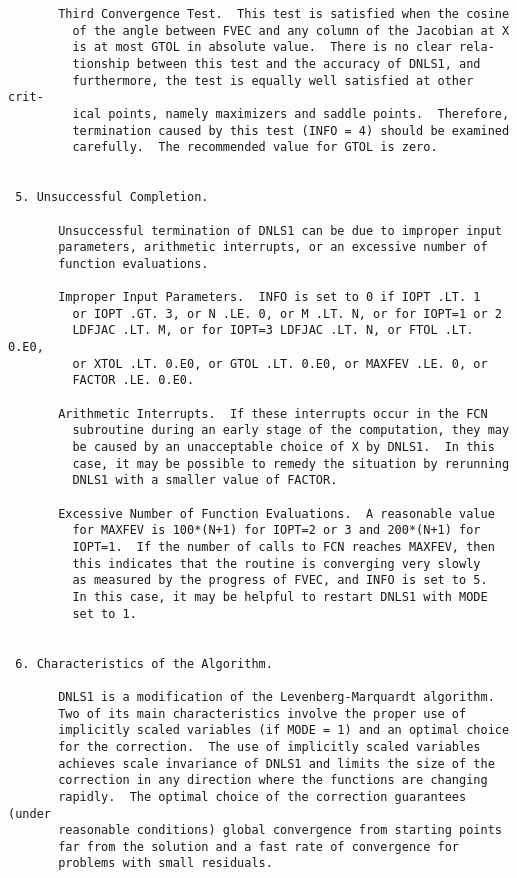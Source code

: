 \begin{verbatim}
       Third Convergence Test.  This test is satisfied when the cosine
         of the angle between FVEC and any column of the Jacobian at X
         is at most GTOL in absolute value.  There is no clear rela-
         tionship between this test and the accuracy of DNLS1, and
         furthermore, the test is equally well satisfied at other crit-
         ical points, namely maximizers and saddle points.  Therefore,
         termination caused by this test (INFO = 4) should be examined
         carefully.  The recommended value for GTOL is zero.


 5. Unsuccessful Completion.

       Unsuccessful termination of DNLS1 can be due to improper input
       parameters, arithmetic interrupts, or an excessive number of
       function evaluations.

       Improper Input Parameters.  INFO is set to 0 if IOPT .LT. 1
         or IOPT .GT. 3, or N .LE. 0, or M .LT. N, or for IOPT=1 or 2
         LDFJAC .LT. M, or for IOPT=3 LDFJAC .LT. N, or FTOL .LT. 0.E0,
         or XTOL .LT. 0.E0, or GTOL .LT. 0.E0, or MAXFEV .LE. 0, or
         FACTOR .LE. 0.E0.

       Arithmetic Interrupts.  If these interrupts occur in the FCN
         subroutine during an early stage of the computation, they may
         be caused by an unacceptable choice of X by DNLS1.  In this
         case, it may be possible to remedy the situation by rerunning
         DNLS1 with a smaller value of FACTOR.

       Excessive Number of Function Evaluations.  A reasonable value
         for MAXFEV is 100*(N+1) for IOPT=2 or 3 and 200*(N+1) for
         IOPT=1.  If the number of calls to FCN reaches MAXFEV, then
         this indicates that the routine is converging very slowly
         as measured by the progress of FVEC, and INFO is set to 5.
         In this case, it may be helpful to restart DNLS1 with MODE
         set to 1.


 6. Characteristics of the Algorithm.

       DNLS1 is a modification of the Levenberg-Marquardt algorithm.
       Two of its main characteristics involve the proper use of
       implicitly scaled variables (if MODE = 1) and an optimal choice
       for the correction.  The use of implicitly scaled variables
       achieves scale invariance of DNLS1 and limits the size of the
       correction in any direction where the functions are changing
       rapidly.  The optimal choice of the correction guarantees (under
       reasonable conditions) global convergence from starting points
       far from the solution and a fast rate of convergence for
       problems with small residuals.


\end{verbatim}

